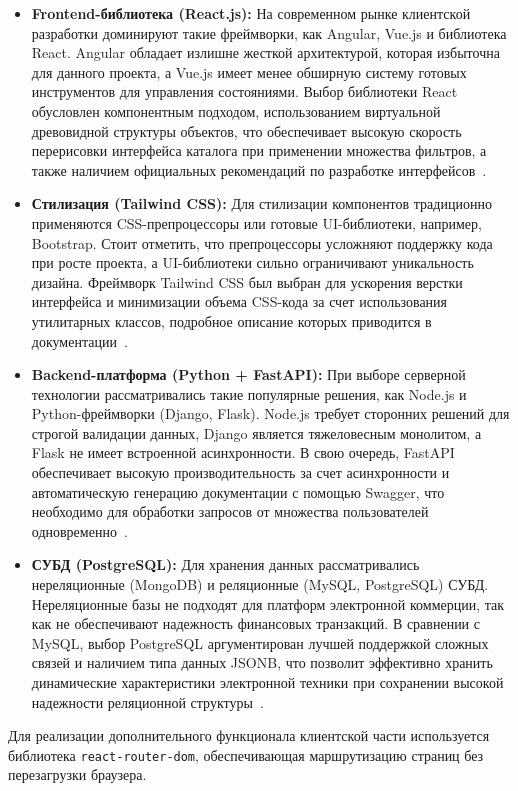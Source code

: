 \begin{itemize}
    \item \textbf{Frontend-библиотека (React.js):} На современном рынке клиентской разработки доминируют такие фреймворки, как Angular, Vue.js и библиотека React. Angular 
	обладает излишне жесткой архитектурой, которая избыточна для данного проекта, а Vue.js имеет менее обширную систему готовых инструментов для управления состояниями. Выбор библиотеки 
	React обусловлен компонентным подходом, использованием виртуальной древовидной структуры объектов, что обеспечивает высокую 
	скорость перерисовки интерфейса каталога при применении множества фильтров, а также наличием официальных рекомендаций по разработке интерфейсов~\cite{react_docs}.
    \item \textbf{Стилизация (Tailwind CSS):} Для стилизации компонентов традиционно применяются CSS-препроцессоры или готовые UI-библиотеки, например, Bootstrap. Стоит отметить, что 
	препроцессоры усложняют поддержку кода при росте проекта, а UI-библиотеки сильно ограничивают уникальность дизайна. Фреймворк Tailwind CSS был выбран для ускорения верстки интерфейса и минимизации 
	объема CSS-кода за счет использования утилитарных классов, подробное описание которых приводится в документации~\cite{tailwind_docs}.
    \item \textbf{Backend-платформа (Python + FastAPI):} При выборе серверной технологии рассматривались такие популярные решения, как Node.js и Python-фреймворки (Django, Flask). Node.js требует сторонних 
	решений для строгой валидации данных, Django является тяжеловесным монолитом, а Flask не имеет встроенной асинхронности. В свою очередь, FastAPI обеспечивает высокую производительность за счет асинхронности и 
	автоматическую генерацию документации с помощью Swagger, что необходимо для обработки запросов от множества пользователей одновременно~\cite{fastapi_docs}.
    \item \textbf{СУБД (PostgreSQL):} Для хранения данных рассматривались нереляционные (MongoDB) и реляционные (MySQL, PostgreSQL) СУБД. Нереляционные базы не подходят для платформ электронной коммерции, так как не 
	обеспечивают надежность финансовых транзакций. В сравнении с MySQL, выбор PostgreSQL аргументирован лучшей поддержкой сложных связей и наличием типа данных JSONB, что позволит эффективно хранить динамические 
	характеристики электронной техники при сохранении высокой надежности реляционной структуры~\cite{postgresql_docs}.
\end{itemize}

Для реализации дополнительного функционала клиентской части используется библиотека \texttt{react-router-dom}, обеспечивающая маршрутизацию страниц без перезагрузки браузера.

